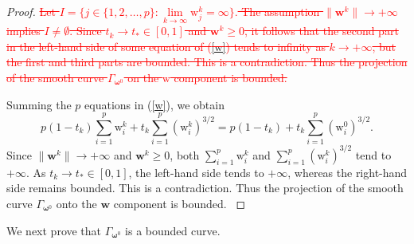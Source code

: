 \documentclass[11pt,pdflatex,sn-mathphys-ay]{sn-jnl}%
\theoremstyle{definition}
\theoremstyle{thmstyleone}%
\theoremstyle{thmstyletwo}%
\theoremstyle{thmstylethree}%
\newcommand{\del}[1]{\textcolor{red}{\sout{#1}}}
\newcommand{\add}[1]{\textcolor{revisionblue}{#1}}
\begin{document}
\begin{proof}
		\noindent \del{Let
			$I=\{j\in\{1,2,\dots,p\}:
			\lim\limits_{k\rightarrow\infty}\text{w}_j^k=\infty\}.$
			The assumption $\|\textbf{w}^k\|\rightarrow+\infty$
			implies $I\neq\emptyset$.
			Since $t_k\rightarrow t_*\in[0,1]$
			and $\textbf{w}^k\geq0$, it follows that
			the second part in the left-hand side of
			some equation of (\ref{w}) tends to infinity
			as $k\rightarrow+\infty$, but the first
			and third parts are bounded.
			This is a contradiction. Thus the projection
			of the smooth curve $\Gamma_{\bm{\omega}^0}$
			on the $\text{w}$ component is bounded.
		}
		
		\noindent 
		\add{
			\noindent Summing the $p$ equations in
			(\ref{w}), we obtain
			\[
			p(1-t_k)\sum_{i=1}^p\text{w}_i^k
			+t_k\sum_{i=1}^p(\text{w}_i^k)^{3/2}
			=
			p(1-t_k)
			+t_k\sum_{i=1}^p(\text{w}_i^0)^{3/2}.
			\]
			Since $\|\textbf{w}^k\|\rightarrow+\infty$
			and $\textbf{w}^k\geq0$, both
			$\sum_{i=1}^p\text{w}_i^k$ and
			$\sum_{i=1}^p(\text{w}_i^k)^{3/2}$
			tend to $+\infty$.
			As $t_k\rightarrow t_*\in[0,1]$,
			the left-hand side tends to $+\infty$,
			whereas the right-hand side remains bounded.
			This is a contradiction. Thus the projection
			of the smooth curve $\Gamma_{\bm{\omega}^0}$
			onto the $\textbf{w}$ component is bounded.
		}
		
	\end{proof}  
	
	We next prove that $\Gamma_{\bm{\omega}^0}$ is a bounded curve.
	
\end{document}
